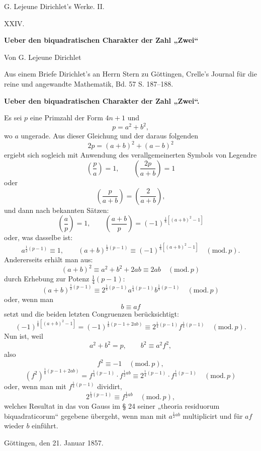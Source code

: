 \documentclass[11pt]{article}
\begin{document}
\begin{center}
{\Large G. Lejeune Dirichlet's Werke. II.}\par\vspace{1.2em}
{\Large XXIV.}\par\vspace{0.5em}
{\LARGE \textbf{Ueber den biquadratischen Charakter der Zahl „Zwei“}}\par\vspace{1em}
{\large Von G. Lejeune Dirichlet}\par\vspace{0.5em}
{\small Aus einem Briefe Dirichlet's an Herrn Stern zu Göttingen, Crelle's Journal für die reine und angewandte Mathematik, Bd. 57 S. 187--188.}
\end{center}

\bigskip
\begin{center}
{\large \textbf{Ueber den biquadratischen Charakter der Zahl „Zwei“.}}
\end{center}

Es sei $p$ eine Primzahl der Form $4n+1$ und
\[
p=a^2+b^2,
\]
wo $a$ ungerade. Aus dieser Gleichung und der daraus folgenden
\[
2p=(a+b)^2+(a-b)^2
\]
ergiebt sich sogleich mit Anwendung des verallgemeinerten Symbols von Legendre
\[
\left(\frac{p}{a}\right)=1, \qquad \left(\frac{2p}{a+b}\right)=1
\]
oder
\[
\left(\frac{p}{a+b}\right)=\left(\frac{2}{a+b}\right),
\]
und dann nach bekannten Sätzen:
\[
\left(\frac{a}{p}\right)=1, \qquad \left(\frac{a+b}{p}\right)=(-1)^{\frac18[(a+b)^2-1]}
\]
oder, was dasselbe ist:
\[
a^{\frac12(p-1)}\equiv 1, \qquad (a+b)^{\frac12(p-1)}\equiv (-1)^{\frac18[(a+b)^2-1]} \quad (\mathrm{mod}.\,p).
\]
Andererseits erhält man aus:
\[
(a+b)^2 \equiv a^2+b^2+2ab \equiv 2ab \quad (\mathrm{mod}.\,p)
\]
durch Erhebung zur Potenz $\frac14(p-1)$:
\[
(a+b)^{\frac12(p-1)}\equiv 2^{\frac14(p-1)}a^{\frac14(p-1)}b^{\frac14(p-1)} \quad (\mathrm{mod}.\,p)
\]
oder, wenn man
\[
b\equiv af
\]
setzt und die beiden letzten Congruenzen berücksichtigt:
\[
(-1)^{\frac18[(a+b)^2-1]}=(-1)^{\frac18(p-1+2ab)}\equiv 2^{\frac14(p-1)}f^{\frac14(p-1)} \quad (\mathrm{mod}.\,p).
\]
Nun ist, weil
\[
a^2+b^2=p, \qquad b^2\equiv a^2f^2,
\]
also
\[
f^2\equiv -1 \quad (\mathrm{mod}.\,p),
\]
\[
(f^2)^{\frac18(p-1+2ab)}=f^{\frac14(p-1)}\cdot f^{\frac12 ab}\equiv 2^{\frac14(p-1)}\cdot f^{\frac14(p-1)} \quad (\mathrm{mod}.\,p)
\]
oder, wenn man mit $f^{\frac14(p-1)}$ dividirt,
\[
2^{\frac14(p-1)}\equiv f^{\frac12 ab} \quad (\mathrm{mod}.\,p),
\]
welches Resultat in das von Gauss im § 24 seiner „theoria residuorum biquadraticorum“ gegebene übergeht, wenn man mit $a^{\frac12ab}$ multiplicirt und für $af$ wieder $b$ einführt.

\begin{center}
Göttingen, den 21. Januar 1857.
\end{center}
\end{document}
